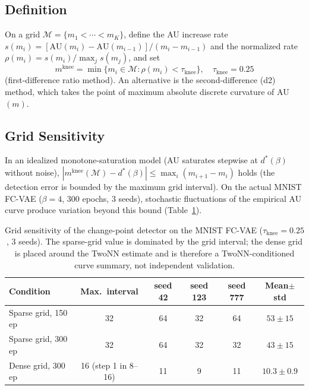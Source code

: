 \documentclass[make,article,submit,pdftex,moreauthors]{Definitions/mdpi}
\newcommand{\mknee}{m^{\mathrm{knee}}}
\newcommand{\dstar}{d^{*}(\beta)}
\begin{document}
\subsection[\appendixname~\thesubsection]{Definition}

On a grid $\mathcal{M} = \{m_1 < \cdots < m_K\}$, define the AU increase
rate $s(m_i) = [\mathrm{AU}(m_i) - \mathrm{AU}(m_{i-1})] / (m_i - m_{i-1})$
and the normalized rate $\rho(m_i) = s(m_i) / \max_j s(m_j)$, and set
\begin{equation}
  \mknee = \min\{m_i \in \mathcal{M} : \rho(m_i) < \tau_{\mathrm{knee}}\},
  \quad \tau_{\mathrm{knee}} = 0.25
  \label{eq:mknee}
\end{equation}
(first-difference ratio method).
An alternative is the second-difference (d2) method, which takes the point
of maximum absolute discrete curvature of AU$(m)$.

\subsection[\appendixname~\thesubsection]{Grid Sensitivity}

In an idealized monotone-saturation model (AU saturates stepwise at
$\dstar$ without noise),
$|\mknee(\mathcal{M}) - \dstar| \leq \max_i (m_{i+1} - m_i)$ holds
(the detection error is bounded by the maximum grid interval).
On the actual MNIST FC-VAE ($\beta = 4$, 300 epochs, 3 seeds), stochastic
fluctuations of the empirical AU curve produce variation beyond this bound
(Table~\ref{tab:knee_grid}).

\begin{table}[H]
\caption{Grid sensitivity of the change-point detector on the MNIST FC-VAE
($\tau_{\mathrm{knee}} = 0.25$, 3 seeds). The sparse-grid value is dominated
by the grid interval; the dense grid is placed around the TwoNN estimate and
is therefore a TwoNN-conditioned curve summary, not independent
validation.}
\label{tab:knee_grid}
\small
\begin{tabular}{lccccc}
\toprule
\textbf{Condition} & \textbf{Max.\ interval} & \textbf{seed 42} & \textbf{seed 123} & \textbf{seed 777} & \textbf{Mean$\pm$std} \\
\midrule
Sparse grid, 150 ep & 32 & 64 & 32 & 64 & $53 \pm 15$ \\
Sparse grid, 300 ep & 32 & 64 & 32 & 32 & $43 \pm 15$ \\
Dense grid, 300 ep & 16 (step 1 in 8--16) & 11 & 9 & 11 & $10.3 \pm 0.9$ \\
\bottomrule
\end{tabular}
\end{table}
\end{document}

